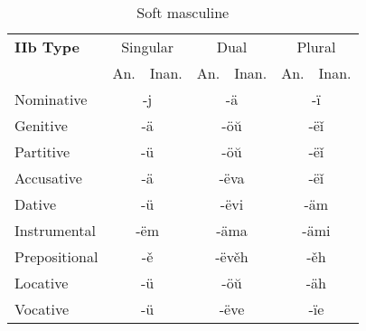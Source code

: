 \begin{table}
	\caption{Soft masculine}
	\begin{tabular}{lllllll}
		\textbf{IIb Type}       
		& \multicolumn{2}{c}{Singular} 
		& \multicolumn{2}{c}{Dual} 
		& \multicolumn{2}{c}{Plural} \\
		& An.   & Inan.  & An.   & Inan.   & An.  & Inan. \\
		Nominative    & \multicolumn{2}{c}{-j}      
		& \multicolumn{2}{c}{-ä}        
		& \multicolumn{2}{c}{-ï} \\
		Genitive      & \multicolumn{2}{c}{-ä}       
		& \multicolumn{2}{c}{-öŭ}      
		& \multicolumn{2}{c}{-ëǐ}   \\
		Partitive     & \multicolumn{2}{c}{-ü}       
		& \multicolumn{2}{c}{-öŭ}      
		& \multicolumn{2}{c}{-ëǐ} \\
		Accusative    & \multicolumn{2}{c}{-ä}     
		& \multicolumn{2}{c}{-ëva} 
		& \multicolumn{2}{c}{-ëǐ} \\
		Dative		  & \multicolumn{2}{c}{-ü}       
		& \multicolumn{2}{c}{-ëvi}     
		& \multicolumn{2}{c}{-äm} \\
		Instrumental  & \multicolumn{2}{c}{-ëm}     
		& \multicolumn{2}{c}{-äma}     
		& \multicolumn{2}{c}{-ämi} \\
		Prepositional & \multicolumn{2}{c}{-ě}       
		& \multicolumn{2}{c}{-ëvěh}     
		& \multicolumn{2}{c}{-ěh} \\
		Locative      & \multicolumn{2}{c}{-ü}      
		& \multicolumn{2}{c}{-öŭ}       
		& \multicolumn{2}{c}{-äh} \\ 
		Vocative      & \multicolumn{2}{c}{-ü}       
		& \multicolumn{2}{c}{-ëve}      
		& \multicolumn{2}{c}{-ïe}
	\end{tabular}
\end{table}



